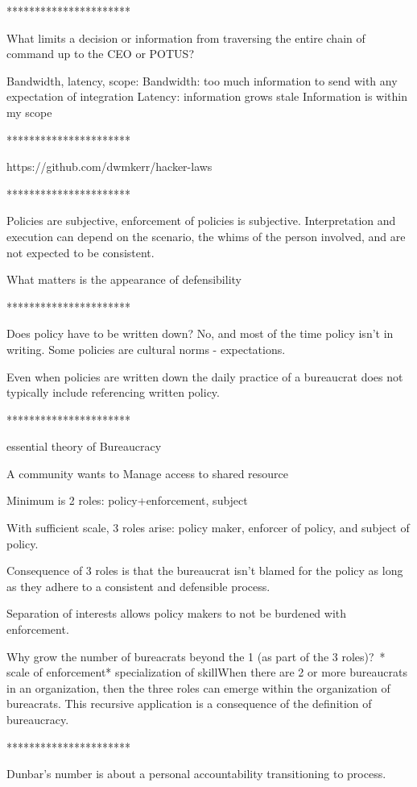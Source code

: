 **********************

What limits a decision or information from traversing the entire chain of command up to the CEO or POTUS?

Bandwidth, latency, scope:
Bandwidth: too much information to send with any expectation of integration 
Latency: information grows stale 
Information is within my scope



**********************

https://github.com/dwmkerr/hacker-laws

**********************

Policies are subjective, enforcement of policies is subjective. Interpretation and execution can depend on the scenario, the whims of the person involved, and are not expected to be consistent.

What matters is the appearance of defensibility

**********************

Does policy have to be written down? 
No, and most of the time policy isn't in writing. Some policies are cultural norms - expectations. 

Even when policies are written down the daily practice of a bureaucrat does not typically include referencing written policy.

**********************

essential theory of Bureaucracy

A community wants to Manage access to shared resource

Minimum is 2 roles: policy+enforcement, subject

With sufficient scale, 3 roles arise: policy maker, enforcer of policy, and subject of policy.

Consequence of 3 roles is that the bureaucrat isn't blamed for the policy as long as they adhere to a consistent and defensible process. 

Separation of interests allows policy makers to not be burdened with enforcement.

Why grow the number of bureacrats beyond the 1 (as part of the 3 roles)? * scale of enforcement* specialization of skillWhen there are 2 or more bureaucrats in an organization, then the three roles can emerge within the organization of bureacrats. This recursive application is a consequence of the definition of bureaucracy.

**********************

Dunbar's number is about a personal accountability transitioning to process.


